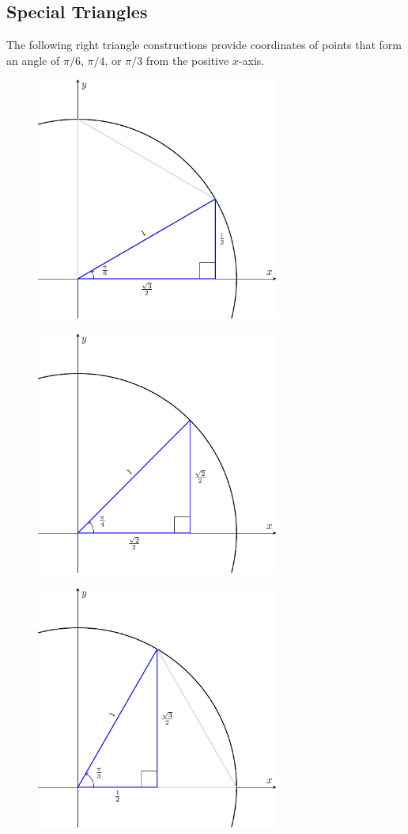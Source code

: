 \documentclass{article}
\begin{document}
\subsection{Special Triangles}
The following right triangle constructions provide coordinates of
points that form an angle of \(\pi/6\), \(\pi/4\), or \(\pi/3\) from the
positive \(x\)-axis.
\begin{figure}[H]
    \centering
    \includegraphics[width=8cm]{figures/unit-circle-30.pdf}
\end{figure}
\begin{figure}[H]
    \centering
    \includegraphics[width=8cm]{figures/unit-circle-45.pdf}
\end{figure}
\begin{figure}[H]
    \centering
    \includegraphics[width=8cm]{figures/unit-circle-60.pdf}
\end{figure}
\end{document}

